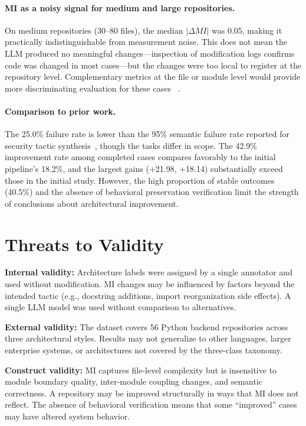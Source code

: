 \documentclass[sigconf,review,anonymous]{acmart}
\begin{document}
\paragraph{MI as a noisy signal for medium and large repositories.} On medium repositories (30--80 files), the median $|\Delta MI|$ was 0.05, making it practically indistinguishable from measurement noise. This does not mean the LLM produced no meaningful changes---inspection of modification logs confirms code was changed in most cases---but the changes were too local to register at the repository level. Complementary metrics at the file or module level would provide more discriminating evaluation for these cases~ \cite{lenarduzzi2023critical}.

\paragraph{Comparison to prior work.} The 25.0\% failure rate is lower than the 95\% semantic failure rate reported for security tactic synthesis~\cite{shokri2024ipsynth}, though the tasks differ in scope. The 42.9\% improvement rate among completed cases compares favorably to the initial pipeline's 18.2\%, and the largest gains (+21.98, +18.14) substantially exceed those in the initial study. However, the high proportion of stable outcomes (40.5\%) and the absence of behavioral preservation verification limit the strength of conclusions about architectural improvement.

\section{Threats to Validity}

\textbf{Internal validity:} Architecture labels were assigned by a single annotator and used without modification. MI changes may be influenced by factors beyond the intended tactic (e.g., docstring additions, import reorganization side effects). A single LLM model was used without comparison to alternatives.

\textbf{External validity:} The dataset covers 56 Python backend repositories across three architectural styles. Results may not generalize to other languages, larger enterprise systems, or architectures not covered by the three-class taxonomy.

\textbf{Construct validity:} MI captures file-level complexity but is insensitive to module boundary quality, inter-module coupling changes, and semantic correctness. A repository may be improved structurally in ways that MI does not reflect. The absence of behavioral verification means that some ``improved'' cases may have altered system behavior.
\end{document}
